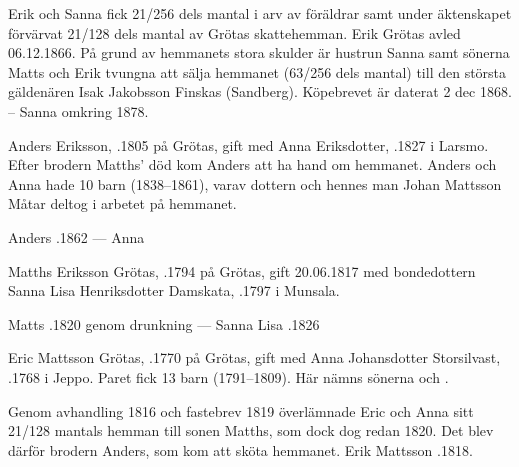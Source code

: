 Erik och Sanna fick 21/256 dels mantal i arv av föräldrar samt under äktenskapet förvärvat 21/128 dels mantal av Grötas skattehemman.	Erik Grötas avled 06.12.1866. På grund av  hemmanets stora skulder är hustrun Sanna samt sönerna Matts och Erik tvungna att sälja hemmanet (63/256 dels mantal) till den största gäldenären Isak Jakobsson Finskas (Sandberg). Köpebrevet är daterat 2 dec 1868. -- Sanna \textdied omkring 1878.


Anders Eriksson, .1805 på Grötas, gift med Anna Eriksdotter, .1827 i Larsmo. Efter brodern Matths' död kom Anders att ha hand om hemmanet. Anders och Anna hade 10 barn (1838--1861), varav dottern  och hennes man Johan Mattsson Måtar deltog i arbetet på hemmanet.

Anders .1862  ---  Anna 


Matths Eriksson Grötas, .1794 på Grötas, gift 20.06.1817 med bondedottern Sanna Lisa Henriksdotter Damskata, .1797 i Munsala.
\begin{jhchildren}
  \item {}
  \item {}
  \item {}
\end{jhchildren}

Matts .1820 genom drunkning  ---  Sanna Lisa .1826


Eric Mattsson Grötas, .1770 på Grötas, gift med Anna Johansdotter Storsilvast, .1768 i Jeppo. Paret fick 13 barn (1791--1809). Här nämns sönerna  och .

Genom avhandling 1816 och fastebrev 1819 överlämnade Eric och Anna sitt 21/128 mantals hemman till sonen Matths, som dock dog redan 1820. Det blev därför brodern Anders, som kom att sköta hemmanet.
Erik Mattsson .1818.


